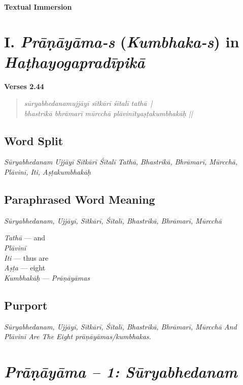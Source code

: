 \thispagestyle{empty}
~
\vfill
\begin{center}
\textbf{\Huge Textual Immersion}
\end{center}
\vfill
\eject

\section*{I. \textit{Prāṇāyāma-s} (\textit{Kumbhaka-s}) in \textit{Haṭhayogapradīpikā}}

\noindent 
\textbf{Verses 2.44}

\begin{verse}
\textit{sūryabhedanamujjāyī sītkārī śītalī tathā |\\
bhastrikā bhrāmarī mūrcchā plāvinītyaṣṭakumbhakāḥ ||}
\end{verse}

\subsection*{Word Split}

\textit{Sūryabhedanam Ujjāyī Sītkārī Śītalī Tathā, Bhastrikā, Bhrāmarī, Mūrcchā, Plāvinī, Iti, Aṣṭakumbhakāḥ}

\subsection*{Paraphrased Word Meaning}

\textit{Sūryabhedanam, Ujjāyī, Sītkārī, Śītalī, Bhastrikā, Bhrāmarī, Mūrcchā}

\begin{multicols}{2}
\textit{Tathā} --- and \\
\textit{Plāvinī}  \\
\textit{Iti}  --- thus are \\
\textit{Aṣṭa} --- eight \\
\textit{Kumbhakāḥ} --- \textit{Prāṇāyāmas} 
\end{multicols}

\subsection*{Purport}

\textit{Sūryabhedanam, Ujjāyī, Sītkārī, Śītalī, Bhastrikā, Bhrāmarī, Mūrcchā And Plāvinī Are The Eight prāṇāyāmas/kumbhakas.}


\section*{\textit{Prāṇāyāma -- 1: Sūryabhedanam}}

